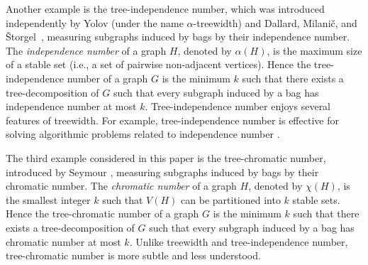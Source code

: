 \documentclass[a4paper, cleveref, autoref, thm-restate]{lipics-v2021}
\newcommand{\T}{\mathcal{T}}
\newcommand{\treea}{{\rm tree}\textnormal{-}\alpha}
\newcommand{\treex}{{\rm tree}\textnormal{-}\chi}
\begin{document}
Another example is the tree-independence number, which was introduced independently by Yolov \cite{Yol-18} (under the name $\alpha$-treewidth) and Dallard, Milani\v{c}, and \v{S}torgel~\cite{DMS-24}, measuring subgraphs induced by bags by their independence number.
The \emph{independence number} of a graph $H$, denoted by $\alpha(H)$, is the maximum size of a stable set (i.e., a set of pairwise non-adjacent vertices).
Hence the tree-independence number of a graph $G$ is the minimum $k$ such that there exists a tree-decomposition of $G$ such that every subgraph induced by a bag has independence number at most $k$.
Tree-independence number enjoys several features of treewidth. %
For example, tree-independence number is effective for solving algorithmic problems related to independence number \cite{DMS-24,lima_et_al:LIPIcs.ESA.2024.85}.

The third example considered in this paper is the tree-chromatic number, introduced by Seymour \cite{Sey-16}, measuring subgraphs induced by bags by their chromatic number.
The \emph{chromatic number} of a graph $H$, denoted by $\chi(H)$, is the smallest integer $k$ such that $V(H)$ can be partitioned into $k$ stable sets.
Hence the tree-chromatic number of a graph $G$ is the minimum $k$ such that there exists a tree-decomposition of $G$ such that every subgraph induced by a bag has chromatic number at most $k$.
Unlike treewidth and tree-independence number, tree-chromatic number is more subtle and less understood.


\end{document}

